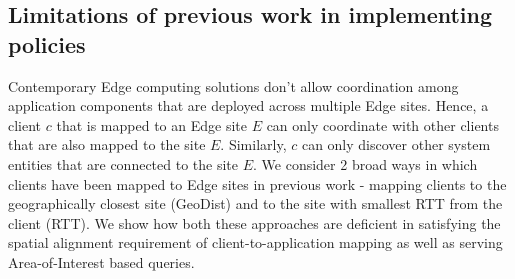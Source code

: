 \subsection{Limitations of previous work in implementing policies}
Contemporary Edge computing solutions don't allow coordination among application components that are deployed across multiple Edge sites. Hence, a client $c$ that is mapped to an Edge site $E$ can only coordinate with other clients that are also mapped to the site $E$. Similarly, $c$ can only discover other system entities that are connected to the site $E$. We consider 2 broad ways in which clients have been mapped to Edge sites in previous work - mapping clients to the geographically closest site (GeoDist) and to the site with smallest RTT from the client (RTT). We show how both these approaches are deficient in satisfying the spatial alignment requirement of client-to-application mapping as well as serving Area-of-Interest based queries.

